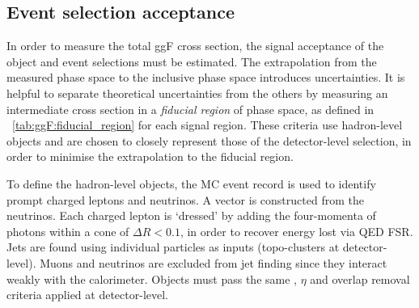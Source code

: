 \subsection{Event selection acceptance}
\label{sec:ggF:acc}

In order to measure the total ggF cross section, the signal acceptance of the object and 
event selections must be estimated. The extrapolation from the measured phase 
space to the inclusive phase space introduces uncertainties. It is helpful to 
separate theoretical uncertainties from the others by measuring an intermediate cross 
section in a \textit{fiducial region} of phase space, as defined in 
\Table~\ref{tab:ggF:fiducial_region} for each signal region. These criteria use 
hadron-level objects and are chosen to closely represent those of the detector-level 
selection, in order to minimise the extrapolation to the fiducial region.

To define the hadron-level objects, the MC event record is used to identify prompt charged 
leptons and neutrinos. A \truthmetvec vector is constructed from the neutrinos. Each charged 
lepton is `dressed' by adding the four-momenta of photons within a cone of 
$\Delta R < 0.1$, in order to recover energy lost via QED FSR. Jets are found using 
individual particles as inputs (\cf topo-clusters at detector-level). Muons and neutrinos 
are excluded from jet finding since they interact weakly with the calorimeter. Objects 
must pass the same \pt, $\eta$ and overlap removal criteria applied at detector-level.

